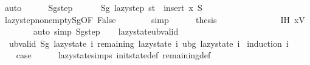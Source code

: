 \begin{isabellebody}
\ auto\isanewline
\isanewline
\ \ \ \ \isamarkupfalse%
\ Sg{\isacharunderscore}{\kern0pt}step{\isacharcolon}{\kern0pt}\isanewline
\ \ \ \ \ \ {\isachardoublequoteopen}Sg\ {\isacharparenleft}{\kern0pt}lazy{\isacharunderscore}{\kern0pt}step\ {\isacharquery}{\kern0pt}st{\isacharparenright}{\kern0pt}\ {\isacharequal}{\kern0pt}\ insert\ {\isacharquery}{\kern0pt}x\ {\isacharquery}{\kern0pt}S{\isachardoublequoteclose}\isanewline
\ \ \ \ \ \ \isamarkupfalse%
\ lazy{\isacharunderscore}{\kern0pt}step{\isacharunderscore}{\kern0pt}nonempty{\isacharunderscore}{\kern0pt}Sg{\isacharbrackleft}{\kern0pt}OF\ False{\isacharbrackright}{\kern0pt}\isanewline
\ \ \ \ \ \ \isamarkupfalse%
\ simp\isanewline
\isanewline
\ \ \ \ \isamarkupfalse%
\ {\isacharquery}{\kern0pt}thesis\isanewline
\ \ \ \ \ \ \isanewline
\ \ \ \ \ \ \isamarkupfalse%
\ IH\ xV\isanewline
\ \ \ \ \ \ \isamarkupfalse%
\ {\isacharparenleft}{\kern0pt}auto\ simp{\isacharcolon}{\kern0pt}\ Sg{\isacharunderscore}{\kern0pt}step{\isacharparenright}{\kern0pt}\isanewline
\ \ \isamarkupfalse%
\isanewline
{}\isamarkupfalse%
%
\endisatagproof
{\isafoldproof}%
%
\isadelimproof
\isanewline
%
\endisadelimproof
\isanewline
{}\isamarkupfalse%
\ lazy{\isacharunderscore}{\kern0pt}state{\isacharunderscore}{\kern0pt}ub{\isacharunderscore}{\kern0pt}valid{\isacharcolon}{\kern0pt}\isanewline
\ \ {\isachardoublequoteopen}ub{\isacharunderscore}{\kern0pt}valid\ {\isacharparenleft}{\kern0pt}Sg\ {\isacharparenleft}{\kern0pt}lazy{\isacharunderscore}{\kern0pt}state\ i{\isacharparenright}{\kern0pt}{\isacharparenright}{\kern0pt}\ {\isacharparenleft}{\kern0pt}remaining\ {\isacharparenleft}{\kern0pt}lazy{\isacharunderscore}{\kern0pt}state\ i{\isacharparenright}{\kern0pt}{\isacharparenright}{\kern0pt}\ {\isacharparenleft}{\kern0pt}ubg\ {\isacharparenleft}{\kern0pt}lazy{\isacharunderscore}{\kern0pt}state\ i{\isacharparenright}{\kern0pt}{\isacharparenright}{\kern0pt}{\isachardoublequoteclose}\isanewline
%
\isadelimproof
%
\endisadelimproof
%
\isatagproof
{}\isamarkupfalse%
\ {\isacharparenleft}{\kern0pt}induction\ i{\isacharparenright}{\kern0pt}\isanewline
\ \ \isamarkupfalse%
\ {}\isanewline
\ \ \isamarkupfalse%
\ {\isacharquery}{\kern0pt}case\isanewline
\ \ \ \ \isamarkupfalse%
\ lazy{\isacharunderscore}{\kern0pt}state{\isachardot}{\kern0pt}simps\ init{\isacharunderscore}{\kern0pt}state{\isacharunderscore}{\kern0pt}def\ remaining{\isacharunderscore}{\kern0pt}def\isanewline

\end{isabellebody}
